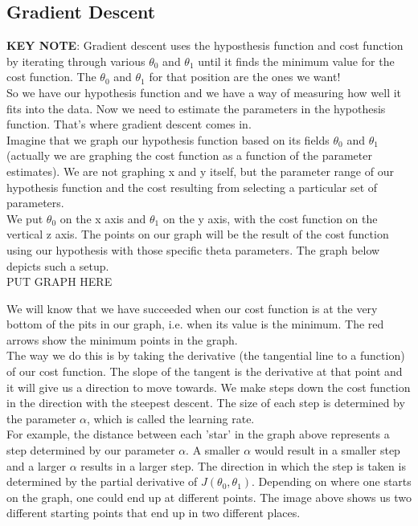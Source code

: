 \subsection{Gradient Descent}

\textbf{KEY NOTE}: Gradient descent uses the hyposthesis function and cost function by iterating through various $\theta_0$ and $ \theta_1$ until it finds the minimum value for the cost function.  The $\theta_0$ and $ \theta_1$ for that position are the ones we want!\\

So we have our hypothesis function and we have a way of measuring how well it fits into the data. Now we need to estimate the parameters in the hypothesis function. That's where gradient descent comes in. \\

Imagine that we graph our hypothesis function based on its fields $\theta_0$ and $ \theta_1$ (actually we are graphing the cost function as a function of the parameter estimates). We are not graphing x and y itself, but the parameter range of our hypothesis function and the cost resulting from selecting a particular set of parameters. \\

We put $\theta_0$ on the x axis and $\theta_1$ on the y axis, with the cost function on the vertical z axis. The points on our graph will be the result of the cost function using our hypothesis with those specific theta parameters. The graph below depicts such a setup.\\

PUT GRAPH HERE

We will know that we have succeeded when our cost function is at the very bottom of the pits in our graph, i.e. when its value is the minimum. The red arrows show the minimum points in the graph.\\

The way we do this is by taking the derivative (the tangential line to a function) of our cost function. The slope of the tangent is the derivative at that point and it will give us a direction to move towards. We make steps down the cost function in the direction with the steepest descent. The size of each step is determined by the parameter $\alpha$, which is called the learning rate.\\

For example, the distance between each 'star' in the graph above represents a step determined by our parameter $\alpha$. A smaller $\alpha$ would result in a smaller step and a larger $\alpha$ results in a larger step. The direction in which the step is taken is determined by the partial derivative of $J(\theta_0,\theta_1)$. Depending on where one starts on the graph, one could end up at different points. The image above shows us two different starting points that end up in two different places. \\

